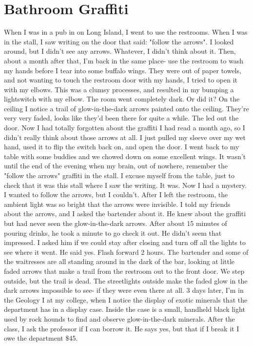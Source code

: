 \documentclass[a4paper]{article}
\begin{document}
\section{Bathroom Graffiti}
When I was in a pub in on Long Island, I went to use the restrooms. When I was in the stall, I saw writing on the door that said: "follow the arrows".
I looked around, but I didn't see any arrows. Whatever, I didn't think about it.
Then, about a month after that, I'm back in the same place- use the restroom to wash my hands before I tear into some buffalo wings.
They were out of paper towels, and not wanting to touch the restroom door with my hands, I tried to open it with my elbows. This was a clumsy processes, and resulted in my bumping a lightswitch with my elbow. The room went completely dark.
Or did it?
On the ceiling I notice a trail of glow-in-the-dark arrows painted onto the ceiling. They're very very faded, looks like they'd been there for quite a while. The led out the door.
Now I had totally forgotten about the graffiti I had read a month ago, so I didn't really think about those arrows at all. I just pulled my sleeve over my wet hand, used it to flip the switch back on, and open the door.
I went back to my table with some buddies and we chowed down on some excellent wings. It wasn't until the end of the evening when my brain, out of nowhere, remember the "follow the arrows" graffiti in the stall. I excuse myself from the table, just to check that it was this stall where I saw the writing. It was. Now I had a mystery.
I wanted to follow the arrows, but I couldn't. After I left the restroom, the ambient light was so bright that the arrows were invisible.
I told my friends about the arrows, and I asked the bartender about it. He knew about the graffiti but had never seen the glow-in-the-dark arrows. After about 15 minutes of pouring drinks, he took a minute to go check it out.
He didn't seem that impressed. I asked him if we could stay after closing and turn off all the lights to see where it went. He said yes.
Flash forward 2 hours. The bartender and some of the waitresses are all standing around in the dark of the bar, looking at little faded arrows that make a trail from the restroom out to the front door.
We step outside, but the trail is dead. The streetlights outside make the faded glow in the dark arrows impossible to see- if they were even there at all.
3 days later, I'm in the Geology I at my college, when I notice the display of exotic minerals that the department has in a display case. Inside the case is a small, handheld black light used by rock hounds to find and observe glow-in-the-dark minerals. After the class, I ask the professor if I can borrow it. He says yes, but that if I break it I owe the department \$45.
\end{document}
